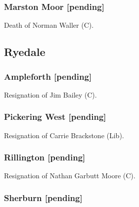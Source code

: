 \documentclass[a4paper,openany]{book}
\begin{document}
\begin{resultsiii}
\subsubsection*{Marston Moor \hspace*{\fill}\nolinebreak[1]%
	\enspace\hspace*{\fill}
	[pending]}


Death of Norman Waller (C).%

\subsection*{Ryedale}

\subsubsection*{Ampleforth \hspace*{\fill}\nolinebreak[1]%
	\enspace\hspace*{\fill}
	[pending]}


Resignation of Jim Bailey (C).

\subsubsection*{Pickering West \hspace*{\fill}\nolinebreak[1]%
	\enspace\hspace*{\fill}
	[pending]}


Resignation of Carrie Brackstone (Lib).

\subsubsection*{Rillington \hspace*{\fill}\nolinebreak[1]%
	\enspace\hspace*{\fill}
	[pending]}


Resignation of Nathan Garbutt Moore (C).

\subsubsection*{Sherburn \hspace*{\fill}\nolinebreak[1]%
	\enspace\hspace*{\fill}
	[pending]}


\end{resultsiii}
\end{document}
